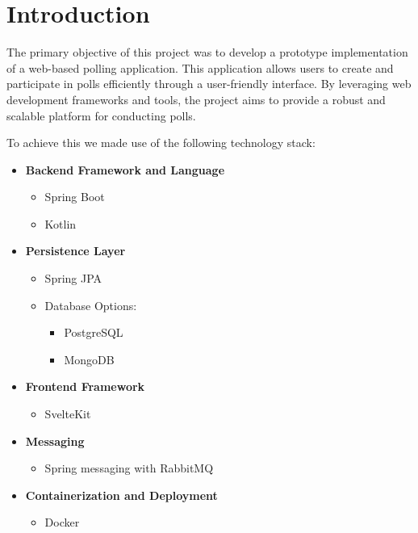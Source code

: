 \section{Introduction}
\label{sec:introduction}

The primary objective of this project was to develop a prototype implementation of a web-based polling application.
This application allows users to create and participate in polls efficiently through a user-friendly interface. 
By leveraging web development frameworks and tools, the project aims to provide a robust and scalable platform for conducting polls.

To achieve this we made use of the following technology stack:

\begin{itemize}
    \item \textbf{Backend Framework and Language}
    \begin{itemize}
        \item Spring Boot
        \item Kotlin
    \end{itemize}

    \item \textbf{Persistence Layer}
    \begin{itemize}
        \item Spring JPA
        \item Database Options:
        \begin{itemize}
            \item PostgreSQL
            \item MongoDB
        \end{itemize}
    \end{itemize}

    \item \textbf{Frontend Framework}
    \begin{itemize}
        \item SvelteKit
    \end{itemize}

    \item \textbf{Messaging}
    \begin{itemize}
        \item Spring messaging with RabbitMQ
    \end{itemize}

    \item \textbf{Containerization and Deployment}
    \begin{itemize}
        \item Docker
    \end{itemize}
\end{itemize}

